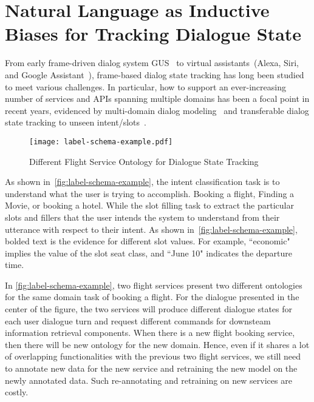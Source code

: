 \chapter{Natural Language as Inductive Biases for Tracking Dialogue State}
\label{chap:sgd}

From early frame-driven dialog system GUS~\citep{bobrow1977gus} to
virtual assistants~(Alexa, Siri, and Google Assistant~\etal),
frame-based dialog state tracking has long been studied to meet
various challenges. In particular, how to support an ever-increasing
number of services and APIs spanning multiple domains has been a focal
point in recent years, evidenced by multi-domain dialog
modeling~\citep{budzianowski2018multiwoz,byrne2019taskmaster,
  shah-etal-2018-bootstrapping} and transferable dialog state tracking
to unseen intent/slots~\cite{mrkvsic2017neural,
  wu2019transferable, hosseini2020simple}.

\begin{figure}[!th]
\centering
\texttt{[image: label-schema-example.pdf]}
\caption{\label{fig:label-schema-example} Different Flight Service
  Ontology for Dialogue State Tracking}
\end{figure}

As shown in~\autoref{fig:label-schema-example}, the intent
classification task is to understand what the user is trying to
accomplish. Booking a flight, Finding a Movie, or booking a
hotel. While the slot filling task to extract the particular slots and
fillers that the user intends the system to understand from their
utterance with respect to their intent. As shown
in~\autoref{fig:label-schema-example}, bolded text is the evidence
for different slot values. For example, ``economic" implies the value
of the slot seat class, and ``June 10" indicates the departure time.

In \autoref{fig:label-schema-example}, two flight services present two
different ontologies for the same domain task of booking a flight. For
the dialogue presented in the center of the figure, the two services
will produce different dialogue states for each user dialogue turn and
request different commands for downsteam information retrieval
components. When there is a new flight booking service, then there
will be new ontology for the new domain. Hence, even if it shares a
lot of overlapping functionalities with the previous two flight services,
we still need to annotate new data for the new service and retraining
the new model on the newly annotated data. Such re-annotating and
retraining on new services are costly.

